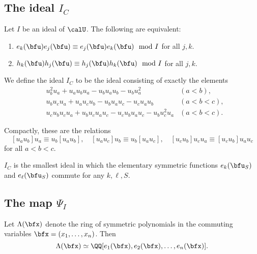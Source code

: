 \documentclass{article}
\begin{document}
\subsection{
    The ideal \texorpdfstring{$I_C$}{I\_C}
}

\begin{lemma}
    Let $I$ be an ideal of $\calU$.
    The following are equivalent:
    \begin{enumerate}[label=(\alph*)]
        \item 
            $e_k(\bfu)e_j(\bfu) \equiv e_j(\bfu)e_k(\bfu) \mod I$ for all $j,k$. 
        \item 
            $h_k(\bfu)h_j(\bfu) \equiv h_j(\bfu)h_k(\bfu) \mod I$ for all $j,k$.
    \end{enumerate}
\end{lemma}



\begin{definition}
    We define the ideal $I_C$ to be the ideal consisting of exactly the elements
    \begin{align}
        &
        u_b^2u_a + u_au_bu_a - u_bu_au_b - u_bu_a^2 
        &
        (a<b),
        \\
        &
        u_bu_cu_a + u_au_cu_b - u_bu_au_c - u_cu_au_b
        &
        (a<b<c),
        \\
        &
        u_cu_bu_cu_a + u_bu_cu_au_c - u_cu_bu_au_c - u_bu_c^2u_a
        &
        (a<b<c).
    \end{align}
\end{definition}

Compactly, these are the relations
\[
    [u_au_b]u_a \equiv u_b[u_au_b], \quad
    [u_au_c]u_b \equiv u_b[u_au_c], \quad
    [u_cu_b]u_cu_a \equiv [u_cu_b]u_au_c
\]
for all $a<b<c$.

\begin{theorem}
    \label{thm:ICImpliesEsCommute}
    $I_C$ is the smallest ideal in which the elementary symmetric functions $e_k(\bfu_S)$ and $e_\ell(\bfu_S)$ commute for any $k,\ell,S$.
\end{theorem}

\subsection{
    The map \texorpdfstring{$\Psi_I$}{Psi\_I}
}

\begin{theorem}
    \label{thm:FundThmSymFuncs}
    Let $\Lambda(\bfx)$ denote the ring of symmetric polynomials in the commuting variables $\bfx = (x_1,\ldots,x_n)$.
    Then
    \[
        \Lambda(\bfx)
        \simeq
        \QQ[e_1(\bfx), e_2(\bfx), \ldots, e_n(\bfx)].
    \]
\end{theorem}
\end{document}
